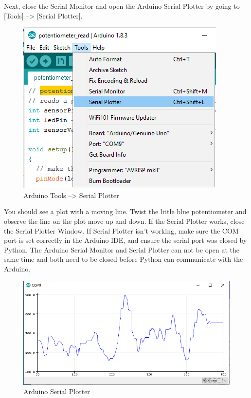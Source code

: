 \documentclass[11pt]{article}
\makeatletter
\def\maxwidth{\ifdim\Gin@nat@width>\linewidth\linewidth
    \else\Gin@nat@width\fi}
\let\Oldincludegraphics\includegraphics
\renewcommand{\includegraphics}[1]{\Oldincludegraphics[width=.8\maxwidth]{#1}}
\makeatother
\begin{document}
Next, close the Serial Monitor and open the Arduino Serial Plotter by
going to {[}Tools{]} --\textgreater{} {[}Serial Plotter{]}.

\begin{figure}
\centering
\includegraphics{images/Tools_SerialPlotter.png}
\caption{Arduino Tools --\textgreater{} Serial Plotter}
\end{figure}

You should see a plot with a moving line. Twist the little blue
potentiometer and observe the line on the plot move up and down. If the
Serial Plotter works, close the Serial Plotter Window. If Serial Plotter
isn't working, make sure the COM port is set correctly in the Arduino
IDE, and ensure the serial port was closed by Python. The Arduino Serial
Monitor and Serial Plotter can not be open at the same time and both
need to be closed before Python can communicate with the Arduino.

\begin{figure}
\centering
\includegraphics{images/serial_plotter_output.png}
\caption{Arduino Serial Plotter}
\end{figure}
\end{document}

